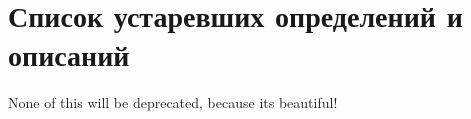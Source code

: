 \chapter{Список устаревших определений и описаний}
\hypertarget{deprecated}{}\label{deprecated}

\begin{DoxyRefList}
\item[Член \doxylink{classMyLibrary_1_1Example_a1c0046b0674eb4cad09c5d3e943912b8}{My\+Library\+::Example\+::test} (const std\+::string \&test)]\label{deprecated__deprecated000001}%
%
None of this will be deprecated, because it\textquotesingle{}s beautiful!
\end{DoxyRefList}